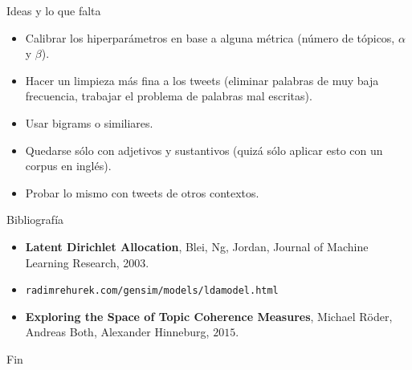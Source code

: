 \documentclass{beamer}
\begin{document}
	\begin{frame}{Ideas y lo que falta}
		\begin{itemize}
			\item Calibrar los hiperparámetros en base a alguna métrica (número de tópicos, $\alpha$ y $\beta$). 
			\item Hacer un limpieza más fina a los tweets (eliminar palabras de muy baja frecuencia, trabajar el problema de palabras mal escritas).
			\item Usar bigrams o similiares.
			\item Quedarse sólo con adjetivos y sustantivos (quizá sólo aplicar esto con un corpus en inglés).
			\item Probar lo mismo con tweets de otros contextos.
		\end{itemize}
	\end{frame}

	\begin{frame}{Bibliografía}
		\begin{itemize}
			\item \textbf{Latent Dirichlet Allocation}, Blei, Ng, Jordan, Journal of Machine Learning Research, 2003.
			\item  \texttt{radimrehurek.com/gensim/models/ldamodel.html}
			\item \textbf{Exploring the Space of Topic Coherence Measures}, Michael Röder, Andreas Both, Alexander Hinneburg, $2015$.
		\end{itemize}
	\end{frame}
	

	\begin{frame}{Fin}
		\centering
	\end{frame}

	
	
\end{document}
